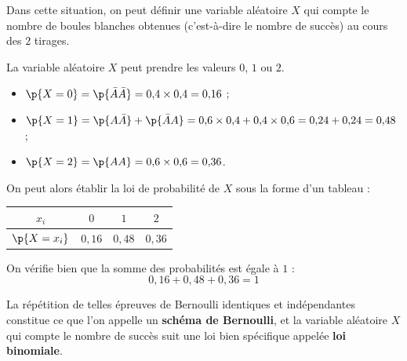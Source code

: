 \begin{rem}
	Dans cette situation, on peut définir une variable aléatoire $X$ qui compte le nombre de boules blanches obtenues (c'est-à-dire le nombre de succès) au cours des $2$ tirages.

	La variable aléatoire $X$ peut prendre les valeurs $0$, $1$ ou $2$.

	\begin{itemize}
		\item $\p{X = 0} = \p{\bar{A}\bar{A}} = 0{,}4 \times 0{,}4 = 0{,}16$ ;
		\item $\p{X = 1} = \p{A\bar{A}} + \p{\bar{A}A} = 0{,}6 \times 0{,}4 + 0{,}4 \times 0{,}6 = 0{,}24 + 0{,}24 = 0{,}48$ ;
		\item $\p{X = 2} = \p{AA} = 0{,}6 \times 0{,}6 = 0{,}36$.
	\end{itemize}

	On peut alors établir la loi de probabilité de $X$ sous la forme d'un tableau :

	\begin{center}
		\renewcommand{\arraystretch}{1.5}
		\begin{tabular}{|c|c|c|c|} \hline
			\ccg $x_i$         & $0$      & $1$      & $2$      \\ \hline
			\ccg $\p{X = x_i}$ & $0{,}16$ & $0{,}48$ & $0{,}36$ \\ \hline
		\end{tabular}
	\end{center}

	On vérifie bien que la somme des probabilités est égale à $1$ :
	\[
		0{,}16 + 0{,}48 + 0{,}36 = 1
	\]

	La répétition de telles épreuves de Bernoulli identiques et indépendantes constitue ce que l'on appelle un \textbf{schéma de Bernoulli}, et la variable aléatoire $X$ qui compte le nombre de succès suit une loi bien spécifique appelée \textbf{loi binomiale}.
\end{rem}

